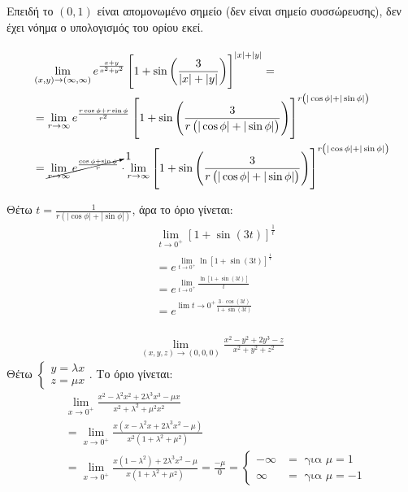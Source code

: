 \documentclass[11pt,a4paper,titlepage]{article}
\begin{document}
Επειδή το \((0,1)\) είναι απομονωμένο σημείο (δεν είναι σημείο συσσώρευσης), δεν έχει νόημα ο υπολογισμός του ορίου εκεί.

\paragraph{}
\begin{align*}
 &\lim_{(x,y)\to(\infty,\infty)}
 e^{\frac{x+y}{x^2+y^2}}
 \left[
 1+ \sin \left(
 \frac{3}{|x|+|y|}
 \right)
 \right]^{|x|+|y|}
 = \\ &=
\lim_{r\to\infty}
e^{\frac{r\cos\phi+r\sin\phi}{r^2}}
\left[
 1+ \sin \left(
 \frac{3}{r\left(|\cos\phi|+|\sin\phi|\right)}
 \right)
 \right]^{r\left(|\cos\phi|+|\sin\phi|\right)}
 \\ &=
\cancelto{1}{\lim_{r\to\infty} e^{ \frac{\cos\phi+\sin\phi}{r}  }}
\cdot
\lim_{r\to\infty}
\left[
 1+ \sin \left(
 \frac{3}{r\left(|\cos\phi|+|\sin\phi|\right)}
 \right)
 \right]^{r\left(|\cos\phi|+|\sin\phi|\right)}
\end{align*}

Θέτω \(t=\frac{1}{r\left(|\cos\phi|+|\sin\phi|\right)}\), άρα το όριο γίνεται:
\begin{align*}
& \lim_{t\to0^+}
\left[
1+\sin(3t)
\right]^\frac{1}{t} \\
&=
e^{\lim_{t\to0^+} \ln \left[
1+\sin(3t)
 \right]^\frac{1}{t}}
 \\ &=
e^{\lim_{t\to0^+} \frac{\ln \left[
1+\sin(3t)\right]}{t}
 } \\
 &=
 e^{
 \lim{t\to0^+}
 \frac{3\cdot\cos(3t)}{1+\sin(3t)}
 }
\end{align*}

\paragraph{}
\begin{align*}
 \lim_{(x,y,z)\to(0,0,0)} \frac{x^2-y^2+2y^3-z}{x^2+y^2+z^2}
\end{align*}
Θέτω \(\begin{cases}y=\lambda x\\ z = \mu x\end{cases}\). Το όριο γίνεται:
\begin{align*}
& \lim_{x\to0^+}
\frac{x^2-\lambda^2x^2+2\lambda^3x^3-\mu x}{x^2+\lambda^2+\mu ^2 x^2}
\\ &=
\lim_{x\to0^+}
\frac{x(x-\lambda^2x+2\lambda^3x^2-\mu)}{x^2(1+\lambda^2+\mu^2)} \\ &=
\lim_{x\to0^+}
\frac{x(1-\lambda^2)+2\lambda^3x^2-\mu}{x(1+\lambda^2+\mu^2)} = \frac{-\mu}{0} =
\begin{cases}
-\infty &= \text{ για } \mu = 1 \\
\infty &= \text{ για } \mu = -1
\end{cases}
\end{align*}
\end{document}
